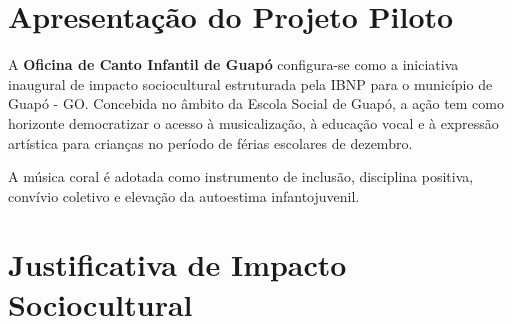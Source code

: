 \documentclass[12pt,a4paper]{article}
\begin{document}
\vspace{0.3cm}

\section{Apresentação do Projeto Piloto}

A \textbf{Oficina de Canto Infantil de Guapó} configura-se como a iniciativa inaugural de impacto sociocultural estruturada pela IBNP para o município de Guapó - GO. Concebida no âmbito da Escola Social de Guapó, a ação tem como horizonte democratizar o acesso à musicalização, à educação vocal e à expressão artística para crianças no período de férias escolares de dezembro.

A música coral é adotada como instrumento de inclusão, disciplina positiva, convívio coletivo e elevação da autoestima infantojuvenil.


\vspace{0.3cm}

\section{Justificativa de Impacto Sociocultural}
\end{document}
